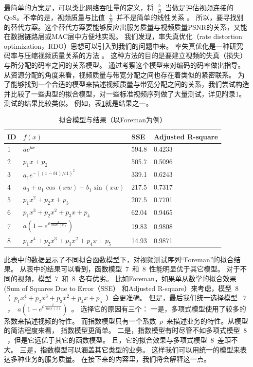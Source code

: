 \begin{enumerate}[(1)]
最简单的方案是，可以类比网络吞吐量的定义，将~$\frac{b}{B}$~当做是评估视频连接的QoS。不幸的是，视频质量与比值~$\frac{b}{B}$~并不是简单的线性关系
 \cite{He1013856}。
所以，要寻找别的替代方案。这个替代方案要能够反应出服务质量与视频质量PSNR的关系，又能在数据链路层或MAC层中方便地实现。
我们发现，率失真优化（rate distortion optimization，RDO）思想可以引入到我们的问题中来。
率失真优化是一种研究码率与压缩视频质量关系的方法
\cite{He1013856}\cite{E-H-Yang.TIP.2007} \cite{J-Y-Liu.ICIP.2009} 。
这种方法的目的是要建立视频的失真（损失）与所分配的码率之间的关系模型。
通过考察这个模型来对编码的码率做出指导。
从资源分配的角度来看，视频质量与带宽分配之间也存在着类似的紧密联系。
为了能够找到一个合适的模型来描述视频质量与带宽分配之间的关系，我们尝试构造并比较了一些典型的拟合模型，对一些标准视频序列做了大量测试，详见附录1。 测试的结果比较类似。 例如，表\ref{tb:chap_cacop:fit_functions}就是结果之一。
\begin{table}[tb]
\caption{拟合模型与结果（以Foreman为例）} 
\label{tb:chap_cacop:fit_functions}
\centering
\wuhao
\begin{tabularx}{0.99\linewidth}{p{}p{}p{}p{}}
\toprule
ID& $f(x)$ & SSE & Adjusted R-square\\
\midrule
1&$ae^{bx}$ & 594.8 &0.4233\\
2&$p_1 x + p_2$ & 505.7 & 0.5096\\
3&$a_1e^{-((x-b1)/c1)^2}$&339.1&0.6243\\
4&$a_0 + a_1\cos(xw) + b_1\sin(xw)$&217.5&0.7317\\
5&$p_1x^2 + p_2x + p_3$ &207.5 & 0.7701\\
6&$p_1x^3 + p_2x^2 + p_3x + p_4$&62.04&0.9465\\
7&$a(1-e^{ \rho \frac{x}{\max(x)}})$ &19.83 & 0.9808\\
8&$p_1x^4 + p_2x^3 + p_3x^2 + p_4x + p_5$&14.93 &0.9871\\
\bottomrule
\end{tabularx}
\end{table}
此表中的数据显示了不同拟合函数模型下，对视频测试序列“Foreman”的拟合结果。
从表中的结果可以看到，函数模型~$7$~和~$8$~性能明显优于其它模型。
对于不同的视频，模型~$7$~和~$8$~各有优劣。
比如Foreman，如果单从数学的拟合效果(Sum of Squares Due to Error（SSE） 和Adjusted R-square）来考虑，模型~$8$~ （~$p_1x^4 + p_2x^3 + p_3x^2 + p_4x + p_5$~）会更准确。
但是，最后我们统一选择模型 ~$7$~，~$a(1-e^{ \rho \frac{x}{\max(x)}})$~。 
选择它的原因有三个：
一是，多项式模型使用了较多的系数来描述视频的特性。
而指数模型只有一个系数~$\rho$~来描述业务的特性。从模型的简洁程度来看，
指数模型更简单。
二是，指数模型有时尽管不如多项式模型~$8$~，但是它远优于其它的函数模型。
且，它的拟合效果与多项式模型~$8$~差距不大。
三是，指数模型可以涵盖其它类型的业务。
这样我们可以用统一的模型来表达多种业务的服务质量。
在接下来的内容里，我们将会解释这一点。


\end{enumerate}
